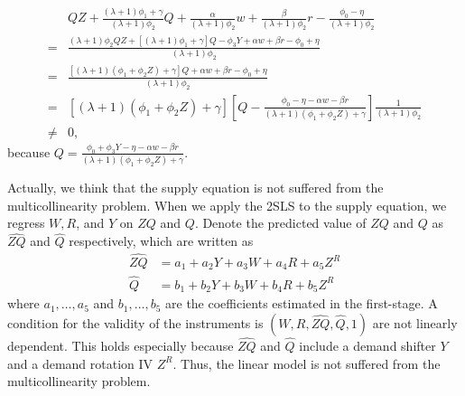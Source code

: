 \documentclass[11pt, a4paper]{article}
\begin{document}
\begin{align*}
    &QZ + \frac{(\lambda + 1)\phi_1 + \gamma}{(\lambda + 1)\phi_2}Q +  \frac{\alpha}{(\lambda + 1)\phi_2} w +  \frac{\beta}{(\lambda + 1)\phi_2}r -\frac{\phi_0 - \eta}{(\lambda + 1)\phi_2} \\
    =&\frac{ (\lambda + 1)\phi_2QZ + [(\lambda + 1)\phi_1 + \gamma]Q  -\phi_3 Y + \alpha w + \beta r - \phi_0 + \eta}{(\lambda + 1)\phi_2}\\
    =& \frac{[(\lambda + 1)(\phi_1 + \phi_2 Z) + \gamma]Q  + \alpha w + \beta r - \phi_0 + \eta}{(\lambda + 1)\phi_2}\\
    =& [(\lambda + 1)(\phi_1 + \phi_2 Z) + \gamma]\left[ Q - \frac{\phi_0 - \eta- \alpha w - \beta r}{(\lambda + 1)(\phi_1 + \phi_2 Z) + \gamma}\right]\frac{1}{(\lambda + 1)\phi_2}\\
    \neq& 0,
\end{align*}
because $Q = \frac{\phi_0 + \phi_3Y -\eta - \alpha w -  \beta r}{(\lambda + 1) (\phi_1 + \phi_2 Z) + \gamma}$.

Actually, we think that the supply equation is not suffered from the multicollinearity problem.
When we apply the 2SLS to the supply equation, we regress $W, R$, and $Y$ on $ZQ$ and $Q$.
Denote the predicted value of $ZQ$ and $Q$ as $\hat{ZQ}$ and $\hat{Q}$ respectively, which are written as
\begin{align*}
    \hat{ZQ} &= a_1 + a_2 Y + a_3 W + a_4 R + a_5 Z^R\\
    \hat{Q}  &= b_1 + b_2 Y + b_3 W + b_4 R + b_5 Z^R
\end{align*}
where $a_1, \ldots, a_5$ and $b_1, \ldots, b_5$ are the coefficients estimated in the first-stage.
A condition for the validity of the instruments is $(W, R, \hat{ZQ}, \hat{Q}, 1)$ are not linearly dependent.
This holds especially because $\hat{ZQ}$ and $\hat{Q}$ include a demand shifter $Y$ and a demand rotation IV $Z^R$.
Thus, the linear model is not suffered from the multicollinearity problem.
\end{document}

